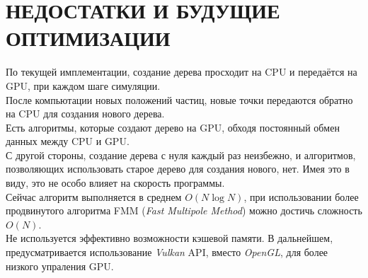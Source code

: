 \documentclass{article}
\begin{document}
\section{НЕДОСТАТКИ И БУДУЩИЕ ОПТИМИЗАЦИИ}
По текущей имплементации, создание дерева просходит на CPU и передаётся на GPU, при каждом шаге симуляции.\\
После компьютации новых положений частиц, новые точки передаются обратно на CPU для создания нового дерева.\\
Есть алгоритмы, которые создают дерево на GPU, обходя постоянный обмен данных между CPU и GPU.\\
С другой стороны, создание дерева с нуля каждый раз неизбежно, и алгоритмов, позволяющих использовать старое дерево для создания нового, нет. Имея это в виду, это не особо влияет на скорость программы.\\
Сейчас алгоритм выполняется в среднем $O(N\log{N})$, при использовании более продвинутого алгоритма FMM (\textit{Fast Multipole Method}) можно достичь сложность $O(N)$.\\
Не используется эффективно возможности кэшевой памяти.
В дальнейшем, предусматривается использование \textit{Vulkan} API, вместо \textit{OpenGL}, для более низкого упраления GPU.

\clearpage

\nocite{*}

\end{document}
